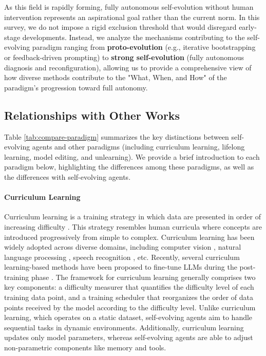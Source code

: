 As this field is rapidly forming, fully autonomous self-evolution without human intervention represents an aspirational goal rather than the current norm. In this survey, we do not impose a rigid exclusion threshold that would disregard early-stage developments. Instead, we analyze the mechanisms contributing to the self-evolving paradigm ranging from \textbf{proto-evolution} (e.g., iterative bootstrapping or feedback-driven prompting) to \textbf{strong self-evolution} (fully autonomous diagnosis and reconfiguration), allowing us to provide a comprehensive view of how diverse methods contribute to the "What, When, and How" of the paradigm's progression toward full autonomy.





\subsection{Relationships with Other Works}


Table \ref{tab:compare-paradigm} summarizes the key distinctions between self-evolving agents and other paradigms (including curriculum learning, lifelong learning, model editing, and unlearning). 
We provide a brief introduction to each paradigm below,  highlighting the differences among these paradigms, as well as the differences with self-evolving agents.

\paragraph{Curriculum Learning}
Curriculum learning is a training strategy in which data are presented in order of increasing difficulty \citep{bengio2009curriculum, wang2021survey}. This strategy resembles human curricula where concepts are introduced progressively from simple to complex. Curriculum learning has been widely adopted across diverse domains, including computer vision \citep{guo2018curriculumnet, jiang2014easy, liu2023towards}, natural language processing \citep{platanios2019competence, tay2019simple}, speech recognition \citep{braun2017curriculum, lotfian2019curriculum}, etc. Recently, several curriculum learning-based methods have been proposed to fine-tune LLMs during the post-training phase \citep{wang2025dump, zhang2025preference, parashar2025curriculum, zhang2025learning, li2025curriculum}. The framework for curriculum learning generally comprises two key components: a difficulty measurer that quantifies the difficulty level of each training data point, and a training scheduler that reorganizes the order of data points received by the model according to the difficulty level. 
Unlike curriculum learning, which operates on a static dataset, self-evolving agents aim to handle sequential tasks in dynamic environments. Additionally, curriculum learning updates only model parameters, whereas self-evolving agents are able to adjust non-parametric components like memory and tools.

